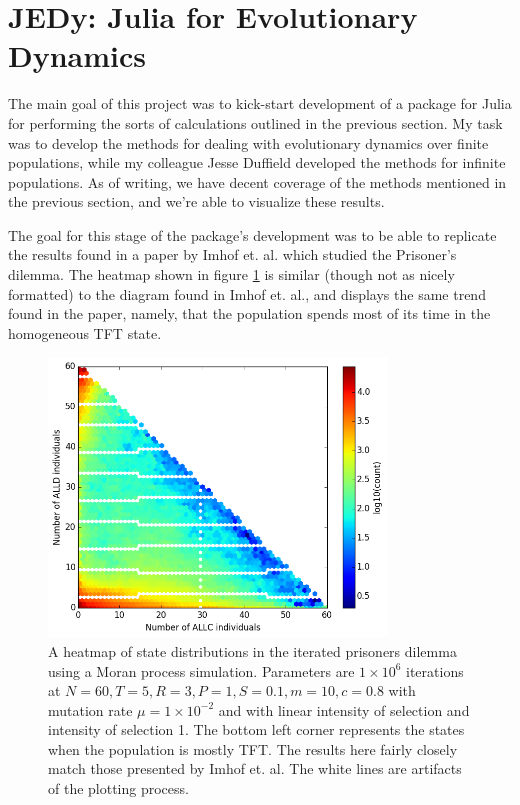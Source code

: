 \section{JEDy: Julia for Evolutionary Dynamics}

The main goal of this project was to kick-start development of a package for Julia for performing the sorts of calculations outlined in the previous section.
My task was to develop the methods for dealing with evolutionary dynamics over finite populations, while my colleague Jesse Duffield developed the methods for infinite populations.
As of writing, we have decent coverage of the methods mentioned in the previous section, and we're able to visualize these results.

The goal for this stage of the package's development was to be able to replicate the results found in a paper by Imhof et. al. \cite{imhofetal} which studied the Prisoner's dilemma.
The heatmap shown in figure \ref{heatmap} is similar (though not as nicely formatted) to the diagram found in Imhof et. al., and displays the same trend found in the paper, namely, that the population spends most of its time in the homogeneous TFT state.

\begin{figure}[h]
    \centering
    \includegraphics[width = 0.8\textwidth]{graphics/heatmap}
    \caption{A heatmap of state distributions in the iterated prisoners dilemma using a Moran process simulation.
    Parameters are $1 \times 10^6$ iterations at $N = 60, T = 5, R = 3, P = 1, S = 0.1, m = 10, c = 0.8$ with mutation rate $\mu = 1 \times 10^{-2}$ and with linear intensity of selection and intensity of selection 1. The bottom left corner represents the states when the population is mostly TFT. The results here fairly closely match those presented by Imhof et. al. The white lines are artifacts of the plotting process.}
    \label{heatmap}
\end{figure}

